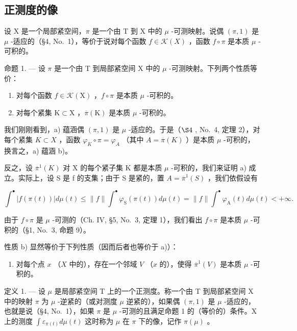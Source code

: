 \subsection{正测度的像}

设 X 是一个局部紧空间，\(\pi\) 是一个由 T 到 X 中的 \(\mu\) -可测映射。说偶 \((\pi,1)\) 是 \(\mu\) -适应的（§4, No.~1），等价于说对每个函数 \(f \in \mathcal{K}(X)\) ，函数 \(f \circ \pi\) 是本质 \(\mu\) -可积的。

命题 1. --- 设 \(\pi\) 是一个由 T 到局部紧空间 X 中的 \(\mu\) -可测映射。下列两个性质等价：

\begin{enumerate}
\def\labelenumi{\alph{enumi})}
\item
  对每个函数 \(f \in \mathcal{K}(\mathrm{X})\) ，\(f \circ \pi\) 是本质 \(\mu\) -可积的。
\item
  对每个紧集 \(\mathrm{K}\subset \mathrm{X}\) ，\(\overline{\pi} (\mathrm{K})\) 是本质 \(\mu\) -可积的。
\end{enumerate}

我们刚刚看到，a) 蕴涵偶 \((\pi,1)\) 是 \(\mu\) -适应的。于是（\(\S4\) , No.~4, 定理 2），对每个紧集 \(K\subset X\) ，函数 \(\varphi_{K}\circ\pi=\varphi_{A}\) （其中 \(A=\overline{\pi}(K)\) ）是本质 \(\mu\) -可积的，换言之，a) 蕴涵 b)。

反之，设 \(\overline{\pi}^{1}(K)\) 对 X 的每个紧子集 K 都是本质 \(\mu\) -可积的，我们来证明 a) 成立。实际上，设 S 是 f 的支集；由于 S 是紧的，置 \(A = \overline{\pi}^{1}(S)\) ，我们依假设有

\[
\int^ {\bullet} \left| f (\pi (t)) \right| d \mu (t) \leqslant \| f \| \int^ {\bullet} \varphi_ {\mathrm{S}} (\pi (t)) d \mu (t) = \| f \| \int^ {\bullet} \varphi_ {\mathrm{A}} (t) d \mu (t) <   + \infty .
\]

由于 \(f \circ \pi\) 是 \(\mu\) -可测的（Ch. IV, §5, No.~3, 定理 1），我们看出 \(f \circ \pi\) 是本质 \(\mu\) -可积的（§1, No.~3, 命题 9）。

性质 b) 显然等价于下列性质（因而后者也等价于 a)）：

\begin{enumerate}
\def\labelenumi{\alph{enumi})}
\setcounter{enumi}{2}
\tightlist
\item
  对每个点 \(x\) （\(X\) 中的），存在一个邻域 \(V\) （\(x\) 的），使得 \(\overline{\pi}^1(V)\) 是本质 \(\mu\) -可积的。
\end{enumerate}

定义 1. --- 设 \(\mu\) 是局部紧空间 T 上的一个正测度。称一个由 T 到局部紧空间 X 中的映射 \(\pi\) 为 \(\mu\) -逆紧的（或对测度 \(\mu\) 逆紧的），如果偶 \((\pi,1)\) 是 \(\mu\) -适应的，也就是说（§4, No.~1），如果 \(\pi\) 是 \(\mu\) -可测的且满足命题 1 的（等价的）条件。X 上的测度 \(\int \varepsilon_{\pi(t)} d\mu(t)\) 这时称为 \(\mu\) 在 \(\pi\) 下的像，记作 \(\pi(\mu)\) 。


